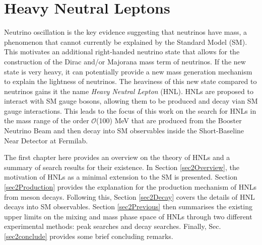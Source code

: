 
\chapter{Heavy Neutral Leptons}

\ifpdf
    \graphicspath{{Chapter2/Figs/Raster/}{Chapter2/Figs/PDF/}{Chapter2/Figs/}}
\else
    \graphicspath{{Chapter2/Figs/Vector/}{Chapter2/Figs/}}
\fi


Neutrino oscillation is the key evidence suggesting that neutrinos have mass, a phenomenon that cannot currently be explained by the Standard Model (SM).
This motivates an additional right-handed neutrino state that allows for the construction of the Dirac and/or Majorana mass term of neutrinos.
If the new state is very heavy, it can potentially provide a new mass generation mechanism to explain the lightness of neutrinos.
The heaviness of this new state compared to neutrinos gains it the name \textit{Heavy Neutral Lepton} (HNL).
HNLs are proposed to interact with SM gauge bosons, allowing them to be produced and decay vian SM gauge interactions.
This leads to the focus of this work on the search for HNLs in the mass range of the order $\mathcal{O}$(100) MeV that are produced from the Booster Neutrino Beam and then decay into SM observables inside the Short-Baseline Near Detector at Fermilab.

The first chapter here provides an overview on the theory of HNLs and a summary of search results for their existence.  
In Section \ref{sec2Overview}, the motivation of HNLs as a minimal extension to the SM is presented.
Section \ref{sec2Production} provides the explanation for the production mechanism of HNLs from meson decays.
Following this, Section \ref{sec2Decay} covers the details of HNL decays into SM observables. 
Section \ref{sec2Previous} then summarises the existing upper limits on the mixing and mass phase space of HNLs through two different experimental methods: peak searches and decay searches.
Finally, Sec. \ref{sec2conclude} provides some brief concluding remarks.

\newpage
